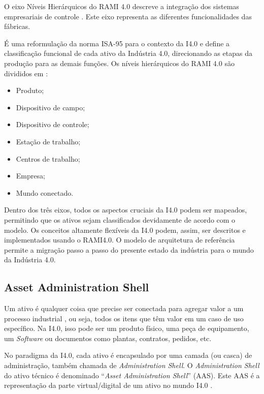	O eixo Níveis Hierárquicos do RAMI 4.0 descreve a integração dos sistemas empresariais de controle \cite{pisching2018arquitetura}. Este eixo representa as diferentes funcionalidades das fábricas.
	
	É uma reformulação da norma ISA-95 para o contexto da I4.0 e define a classificação funcional de cada ativo da Indústria 4.0, direcionando as etapas da produção para as demais funções. Os níveis hierárquicos do RAMI 4.0 são divididos em \cite{adolphs2015rami}:
	 
	\begin{itemize}
			\item Produto;
			\item Dispositivo de campo;
			\item Dispositivo de controle;
			\item Estação de trabalho;
			\item Centros de trabalho;
			\item Empresa;
			\item Mundo conectado.
	\end{itemize}
	
	Dentro dos três eixos, todos os aspectos cruciais da I4.0 podem ser mapeados, permitindo que os ativos sejam classificados devidamente de acordo com o modelo. Os conceitos altamente flexíveis da I4.0 podem, assim, ser descritos e implementados usando o RAMI4.0. O modelo de arquitetura de referência permite a migração passo a passo do presente estado da indústria para o mundo da Indústria 4.0.
	
	\subsection{Asset Administration Shell}
	
	Um ativo é qualquer coisa que precise ser conectada para agregar valor a um processo industrial \cite{bader2019aas}, ou seja, todos os itens que têm valor em um caso de uso específico. Na I4.0, isso pode ser um produto físico, uma peça de equipamento, um \textit{Software} ou documentos como plantas, contratos, pedidos, etc.
	
	No paradigma da I4.0, cada ativo é encapsulado por uma camada (ou casca) de administração, também chamada de \textit{Administration Shell}. O \textit{Administration Shell} do ativo técnico é denominado ``\textit{Asset Administration Shell}'' (AAS). Este AAS é a representação da parte virtual/digital de um ativo no mundo I4.0 \cite{ye2019aas}.
	
